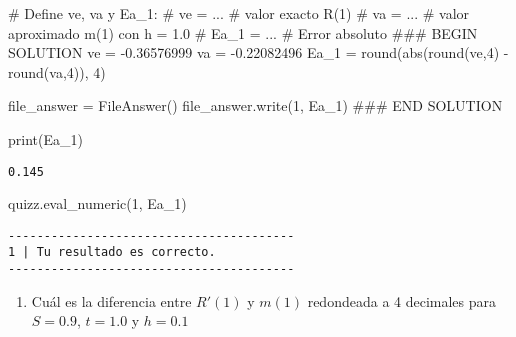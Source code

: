 \documentclass[
  letterpaper,
  DIV=11,
  numbers=noendperiod]{scrreprt}
\newenvironment{Shaded}{\begin{snugshade}}{\end{snugshade}}
\newcommand{\BuiltInTok}[1]{\textcolor[rgb]{0.00,0.23,0.31}{#1}}
\newcommand{\CommentTok}[1]{\textcolor[rgb]{0.37,0.37,0.37}{#1}}
\newcommand{\DecValTok}[1]{\textcolor[rgb]{0.68,0.00,0.00}{#1}}
\newcommand{\FloatTok}[1]{\textcolor[rgb]{0.68,0.00,0.00}{#1}}
\newcommand{\NormalTok}[1]{\textcolor[rgb]{0.00,0.23,0.31}{#1}}
\newcommand{\OperatorTok}[1]{\textcolor[rgb]{0.37,0.37,0.37}{#1}}
\newcommand{\RegionMarkerTok}[1]{\textcolor[rgb]{0.00,0.23,0.31}{#1}}
\newcommand{\StringTok}[1]{\textcolor[rgb]{0.13,0.47,0.30}{#1}}
\providecommand{\tightlist}{%
  \setlength{\itemsep}{0pt}\setlength{\parskip}{0pt}}\usepackage{longtable,booktabs,array}
\begin{document}
\begin{Shaded}
\begin{Highlighting}[]
\CommentTok{\# Define ve, va y Ea\_1:}
\CommentTok{\# ve = ... \# valor exacto R\textquotesingle{}(1) }
\CommentTok{\# va = ... \# valor aproximado m(1) con h = 1.0}
\CommentTok{\# Ea\_1 = ... \# Error absoluto}
\CommentTok{\#\#\# }\RegionMarkerTok{BEGIN}\CommentTok{ SOLUTION}
\NormalTok{ve }\OperatorTok{=} \OperatorTok{{-}}\FloatTok{0.36576999}
\NormalTok{va }\OperatorTok{=} \OperatorTok{{-}}\FloatTok{0.22082496}
\NormalTok{Ea\_1 }\OperatorTok{=} \BuiltInTok{round}\NormalTok{(}\BuiltInTok{abs}\NormalTok{(}\BuiltInTok{round}\NormalTok{(ve,}\DecValTok{4}\NormalTok{) }\OperatorTok{{-}} \BuiltInTok{round}\NormalTok{(va,}\DecValTok{4}\NormalTok{)), }\DecValTok{4}\NormalTok{)}

\NormalTok{file\_answer }\OperatorTok{=}\NormalTok{ FileAnswer()}
\NormalTok{file\_answer.write(}\StringTok{\textquotesingle{}1\textquotesingle{}}\NormalTok{, Ea\_1)}
\CommentTok{\#\#\# }\RegionMarkerTok{END}\CommentTok{ SOLUTION}

\BuiltInTok{print}\NormalTok{(Ea\_1)}
\end{Highlighting}
\end{Shaded}

\begin{verbatim}
0.145
\end{verbatim}

\begin{Shaded}
\begin{Highlighting}[]
\NormalTok{quizz.eval\_numeric(}\StringTok{\textquotesingle{}1\textquotesingle{}}\NormalTok{, Ea\_1)}
\end{Highlighting}
\end{Shaded}

\begin{verbatim}
----------------------------------------
1 | Tu resultado es correcto.
----------------------------------------
\end{verbatim}

\begin{enumerate}
\def\labelenumi{\arabic{enumi}.}
\setcounter{enumi}{1}
\tightlist
\item
  Cuál es la diferencia entre \(R'(1)\) y \(m(1)\) redondeada a 4
  decimales para \(S = 0.9\), \(t = 1.0\) y \(h = 0.1\)
\end{enumerate}
\end{document}
